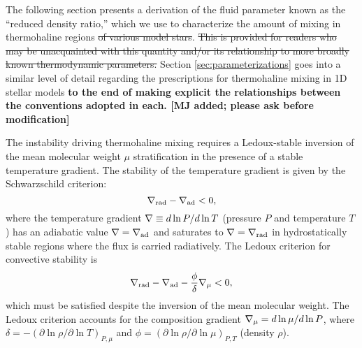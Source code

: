 
The following section presents a derivation of the fluid parameter known as the ``reduced density ratio,'' which we use to characterize the amount of mixing  in thermohaline regions  \sout{of various model stars}. \sout{This is provided for readers who may be unacquainted with this quantity and/or its relationship to more broadly known thermodynamic parameters.} Section \ref{sec:parameterizations} goes into a similar level of detail regarding the prescriptions for thermohaline mixing in 1D stellar models \textbf{to the end of making explicit the relationships between the conventions adopted in each. 
[MJ added; please ask before modification]}

%
The instability driving thermohaline mixing requires a Ledoux-stable inversion of the mean molecular weight $\mu$ stratification in the presence of a stable temperature gradient. 
The stability of the temperature gradient is given by the Schwarzschild criterion:
\begin{equation} \label{eq:Schwarzschild}
    \gradrad - \gradad < 0,
\end{equation}
where the temperature gradient $\nabla \equiv d \ln P / d \ln T$ (pressure $P$ and temperature $T$) has an adiabatic value $\nabla = \nabla_{\rm{ad}}$ and saturates to $\nabla = \nabla_{\rm{rad}}$ in hydrostatically stable regions where the flux is carried radiatively. 
The Ledoux criterion for convective stability is \citep{Ledoux1947}
\begin{equation} \label{eq:Ledoux}
    \gradrad - \gradad - \frac{\phi}{\delta}\gradmu < 0,
\end{equation}
which must be satisfied despite the inversion of the mean molecular weight.
The Ledoux criterion accounts for the composition gradient $\nabla_{\mu} = d\ln\mu/d\ln P$, where $\delta = -(\partial \ln \rho / \partial \ln T)_{P,\mu}$ and $\phi = (\partial \ln \rho / \partial \ln\mu)_{P,T}$ (density $\rho$).

